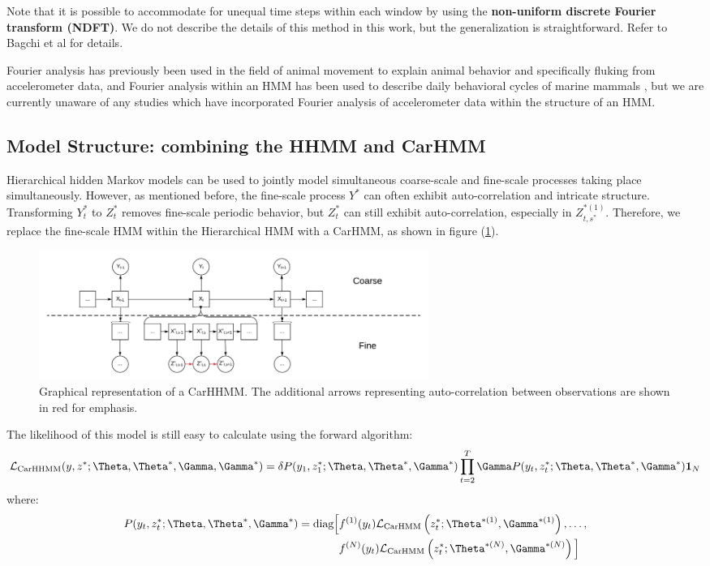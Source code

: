 Note that it is possible to accommodate for unequal time steps within each window by using the \textbf{non-uniform discrete Fourier transform (NDFT)}. We do not describe the details of this method in this work, but the generalization is straightforward. Refer to Bagchi et al \cite{Bagchi:2001} for details.

Fourier analysis has previously been used in the field of animal movement to explain animal behavior \cite{Fehlmann:2017} and specifically fluking \cite{Shorter:2017} from accelerometer data, and Fourier analysis within an HMM has been used to describe daily behavioral cycles of marine mammals  \cite{Heerah:2017}, but we are currently unaware of any studies which have incorporated Fourier analysis of accelerometer data within the structure of an HMM.

\subsection{Model Structure: combining the HHMM and CarHMM}

Hierarchical hidden Markov models can be used to jointly model simultaneous coarse-scale and fine-scale processes taking place simultaneously. However, as mentioned before, the fine-scale process $Y^*$ can often exhibit auto-correlation and intricate structure. Transforming $Y^*_t$ to $Z^*_t$ removes fine-scale periodic behavior, but $Z^*_t$ can still exhibit auto-correlation, especially in $Z_{t,s^*}^{*(1)}$. Therefore, we replace the fine-scale HMM within the Hierarchical HMM with a CarHMM, as shown in figure (\ref{fig:CarHHMM}).

\begin{figure}[h!]
	\centering
	\includegraphics[width=5in]{../Plots/CarHHMM.png}
	\caption{Graphical representation of a CarHHMM. The additional arrows representing auto-correlation between observations are shown in red for emphasis.}
	\label{fig:CarHHMM}
\end{figure}

The likelihood of this model is still easy to calculate using the forward algorithm:
%
$$\calL_{\text{CarHHMM}}(y,z^*;\Theta,\Theta^*,\Gamma,\Gamma^*) = \delta P(y_1,z_1^*;\Theta,\Theta^*,\Gamma^*) \prod_{t=2}^T \Gamma P(y_t,z_t^*;\Theta,\Theta^*,\Gamma^*) \mathbf{1}_N$$
%
where:
%
\begin{align*}
P(y_t,z_t^*;\Theta,\Theta^*,\Gamma^*)  = \text{diag}\Big[&f^{(1)}(y_t)\calL_{\text{CarHMM}}\left(z_t^*;\Theta^{*(1)},\Gamma^{*(1)}\right), \ldots , \\
&f^{(N)}(y_t)\calL_{\text{CarHMM}}\left(z_t^*;\Theta^{*(N)},\Gamma^{*(N)}\right) \Big]
\end{align*}
%